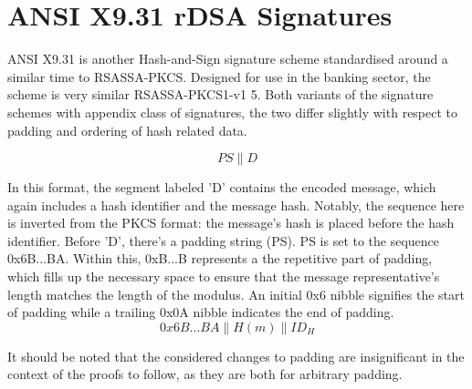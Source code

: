 \documentclass[]{final_report}
\theoremstyle{definition}
\begin{document}
\section{ANSI X9.31 rDSA Signatures}
ANSI X9.31 \cite{ANSI-1998-X9-31} is another Hash-and-Sign signature scheme standardised around a similar time to RSASSA-PKCS. Designed for use in the banking sector, the scheme is very similar RSASSA-PKCS1-v1 5. Both variants of the signature schemes with appendix class of signatures, the two differ slightly with respect to padding and ordering of hash related data.


\[PS\|D\]

In this format, the segment labeled 'D' contains the encoded message, which again includes a hash identifier and the message hash. Notably, the sequence here is inverted from the PKCS format: the message's hash is placed before the hash identifier. Before 'D', there's a padding string (PS). PS is set to the sequence 0x6B...BA. Within this, 0xB...B represents a the repetitive part of padding, which fills up the necessary space to ensure that the message representative's length matches the length of the modulus. An initial 0x6 nibble signifies the start of padding while a trailing 0x0A nibble indicates the end of padding.
\[0x6B . . . BA\|H(m)\|ID_{H}\]

It should be noted that the considered changes to padding are insignificant in the context of the proofs to follow, as they are both for arbitrary padding.
\end{document}
